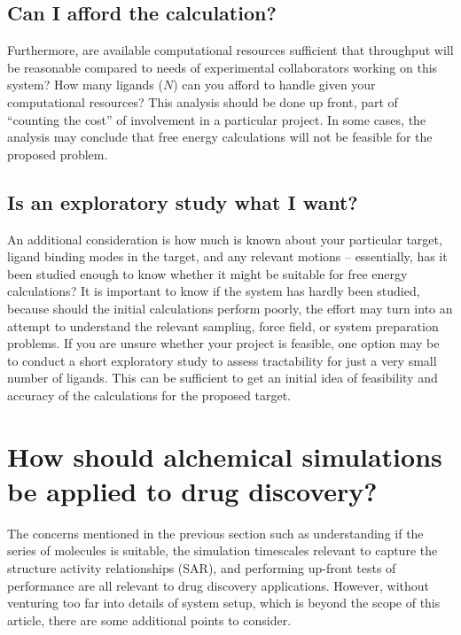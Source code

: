 \documentclass[9pt,bestpractices]{livecoms}
\begin{document}
\subsection*{Can I afford the calculation?}
Furthermore, are available computational resources sufficient that throughput will be
reasonable compared to needs of experimental collaborators working on
this system? How many ligands ($N$) can you afford to handle given
your computational resources?
This analysis should be done up front, part of ``counting the cost''
of involvement in a particular project. In some cases, the analysis may conclude that free energy calculations will not be feasible for the proposed problem.
%
\subsection*{Is an exploratory study what I want?}
An additional consideration is how much is known about your particular
target, ligand binding modes in the target, and any relevant motions
-- essentially, has it been studied enough to know whether it might be
suitable for free energy calculations? It is important to know if the system has hardly been studied, because should the initial calculations perform poorly, the effort may turn into an attempt to understand the relevant sampling, force field, or system preparation problems.
%
If you are unsure whether your project is feasible, one option may be
to conduct a short exploratory study to assess tractability for just a very small
number of ligands. This can be sufficient to get an initial
idea of feasibility and accuracy of the calculations for the
proposed target.

\section{How should alchemical simulations be applied to drug discovery?}

The concerns mentioned in the previous section such as understanding if the series of molecules is suitable, the simulation timescales relevant to capture the structure activity relationships (SAR), and performing up-front tests of performance are all relevant to drug discovery applications. However, without venturing too far into details of system setup, which is beyond the scope of this article, there are some additional points to consider. 
\end{document}
